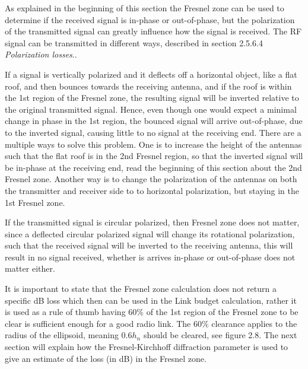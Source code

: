 As explained in the beginning of this section the Fresnel zone can be used to determine if the received signal is in-phase or out-of-phase, but the polarization of the transmitted signal can greatly influence how the signal is received. The RF signal can be transmitted in different ways, described in section 2.5.6.4 \textit{Polarization losses}..

If a signal is vertically polarized and it deflects off a horizontal object, like a flat roof, and then bounces towards the receiving antenna, and if the roof is within the 1st region of the Fresnel zone, the resulting signal will be inverted relative to the original transmitted signal. Hence, even though one would expect a minimal change in phase in the 1st region, the bounced signal will arrive out-of-phase, due to the inverted signal, causing little to no signal at the receiving end. There are a multiple ways to solve this problem. One is to increase the height of the antennas such that the flat roof is in the 2nd Fresnel region, so that the inverted signal will be in-phase at the receiving end, read the beginning of this section about the 2nd Fresnel zone. Another way is to change the polarization of the antennas on both the transmitter and receiver side to to horizontal polarization, but staying in the 1st Fresnel zone. 

If the transmitted signal is circular polarized, then Fresnel zone does not matter, since a deflected circular polarized signal will change its rotational polarization, such that the received signal will be inverted to the receiving antenna, this will result in no signal received, whether is arrives in-phase or out-of-phase does not matter either. 

It is important to state that the Fresnel zone calculation does not return a specific dB loss which then can be used in the Link budget calculation, rather it is used as a rule of thumb having 60\% of the 1st region of the Fresnel zone to be clear is sufficient enough for a good radio link. The 60\% clearance applies to the radius of the ellipsoid, meaning $0.6h_n$ should be cleared, see figure 2.8. The next section will explain how the Fresnel-Kirchhoff diffraction parameter is used to give an estimate of the loss (in dB) in the Fresnel zone. 

